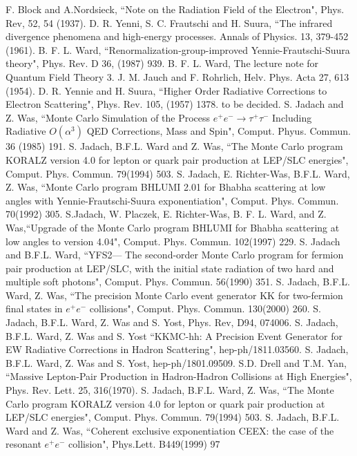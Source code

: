 \documentclass
[
]
{thesis}
\begin{document}
\begin{thebibliography}{widestlabel}
	 F. Block and A.Nordsieck, ``Note on the Radiation Field of the Electron", Phys. Rev, 52, 54 (1937).
	 D. R. Yenni, S. C. Frautschi and H. Suura, ``The infrared divergence phenomena and high-energy processes. Annals of Physics. 13, 379-452 (1961).
	 B. F. L. Ward, ``Renormalization-group-improved Yennie-Frautschi-Suura theory", Phys. Rev. D 36, (1987) 939.
	 B. F. L. Ward, The lecture note for Quantum Field Theory 3.
	 J. M. Jauch and F. Rohrlich, Helv. Phys. Acta 27, 613 (1954).
	 D. R. Yennie and H. Suura, ``Higher Order Radiative Corrections to Electron Scattering", Phys. Rev. 105, (1957) 1378.
	 to be decided.
	 S. Jadach and Z. Was, ``Monte Carlo Simulation of the Process $e^+e^-\to\tau^+\tau^-$ Including Radiative $O(\alpha^3)$ QED Corrections, Mass and Spin", Comput. Phyus. Commun. 36 (1985) 191.
	 S. Jadach, B.F.L. Ward and Z. Was, ``The Monte Carlo program KORALZ version 4.0 for lepton or quark pair production at LEP/SLC energies", Comput. Phys. Commun. 79(1994) 503.
	 S. Jadach, E. Richter-Was, B.F.L. Ward, Z. Was, ``Monte Carlo program BHLUMI 2.01 for Bhabha scattering at low angles with Yennie-Frautschi-Suura exponentiation", Comput. Phys. Commun. 70(1992) 305.
	 S.Jadach, W. Placzek, E. Richter-Was, B. F. L. Ward, and Z. Was,``Upgrade of the Monte Carlo program BHLUMI for Bhabha scattering at low angles to version 4.04",  Comput. Phys. Commun. 102(1997) 229.
	 S. Jadach and B.F.L. Ward, ``YFS2— The second-order Monte Carlo program for fermion pair production at LEP/SLC, with the initial state radiation of two hard and multiple soft photons", Comput. Phys. Commun. 56(1990) 351.
	 S. Jadach, B.F.L. Ward, Z. Was, ``The precision Monte Carlo event generator KK
	for two-fermion final states in $e^+e^-$
	collisions", Comput. Phys. Commun. 130(2000) 260.
	 S. Jadach, B.F.L. Ward, Z. Was and S. Yost, Phys. Rev, D94, 074006.
	 S. Jadach, B.F.L. Ward, Z. Was and S. Yost ``KKMC-hh: A Precision Event Generator for EW Radiative Corrections in Hadron Scattering", hep-ph/1811.03560.
	 S. Jadach, B.F.L. Ward, Z. Was and S. Yost, hep-ph/1801.09509. 
	 S.D. Drell and T.M. Yan, ``Massive Lepton-Pair Production in Hadron-Hadron Collisions at High Energies", Phys. Rev. Lett. 25, 316(1970).
	 S. Jadach, B.F.L. Ward, Z. Was, ``The Monte Carlo program KORALZ version 4.0 for lepton or quark pair production at LEP/SLC energies", Comput. Phys. Commun. 79(1994) 503.
	 S. Jadach, B.F.L. Ward and Z. Was, 
	``Coherent exclusive exponentiation CEEX: the case of the resonant  $e^+e^-$ collision", Phys.Lett. B449(1999) 97
	

\end{thebibliography}
\end{document}
